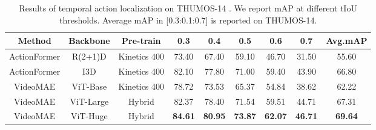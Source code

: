 \begin{table}[t]
\centering
\caption{ Results of temporal action localization on THUMOS-14 . We report mAP at different tIoU thresholds. Average mAP in [0.3:0.1:0.7] is reported on THUMOS-14.}
\begin{tabular}{c|c|c|cccccc }
\hline
 \textbf{ Method}&\textbf{ Backbone} &\textbf{Pre-train} &\textbf{0.3}& \textbf{0.4}& \textbf{0.5}& \textbf{0.6}& \textbf{0.7} & \textbf{Avg.mAP} \\
\hline 
ActionFormer \cite{zhang2022actionformer} & R(2+1)D & Kinetics 400 &  73.40 &67.40 &59.10 &46.70 &31.50 &55.60 \\
ActionFormer \cite{zhang2022actionformer} & I3D & Kinetics 400 & 82.10  &77.80  &71.00 & 59.40 & 43.90  & 66.80  \\
VideoMAE&ViT-Base & Kinetics 400  & 78.72 & 73.53 & 65.37 & 54.84 &38.62& 62.22\\
VideoMAE&ViT-Large &  Hybrid & 82.37 & 78.40 & 71.54 & 59.51 & 44.71&  67.31 \\
VideoMAE&ViT-Huge & Hybrid & \textbf{84.61} & \textbf{80.95} & \textbf{73.87} & \textbf{62.07} &\textbf{46.71} & \textbf{69.64} \\
\hline
\end{tabular}
\label{tab:SOAT_th14}
\vspace{-2mm}
\end{table}